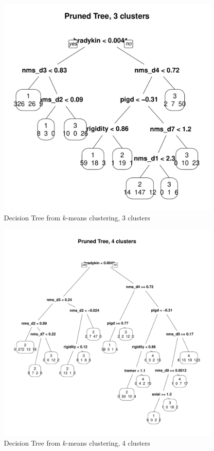 \documentclass[letterpaper,12pt]{article}
\begin{document}
\begin{figure}[ht]
  \centering
  \includegraphics[width=0.8\linewidth]{dtree-kmeans-pruned-3.pdf}
  \caption{Decision Tree from $k$-means clustering, 3 clusters}
  \label{fig:kmeans-dtree-3}
\end{figure}

\begin{figure}[ht]
  \centering
  \includegraphics[width=0.8\linewidth]{dtree-kmeans-pruned-4.pdf}
  \caption{Decision Tree from $k$-means clustering, 4 clusters}
  \label{fig:kmeans-dtree-4}
\end{figure}
\end{document}
